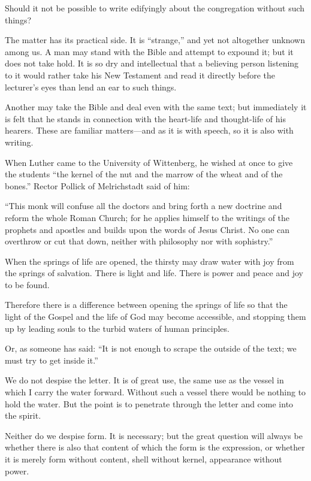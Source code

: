 Should it not be possible to write edifyingly about the congregation without such things?

The matter has its practical side. It is “strange,” and yet not altogether unknown among us. A man may stand with the Bible and attempt to expound it; but it does not take hold. It is so dry and intellectual that a believing person listening to it would rather take his New Testament and read it directly before the lecturer’s eyes than lend an ear to such things.

Another may take the Bible and deal even with the same text; but immediately it is felt that he stands in connection with the heart-life and thought-life of his hearers. These are familiar matters—and as it is with speech, so it is also with writing.

When Luther came to the University of Wittenberg, he wished at once to give the students “the kernel of the nut and the marrow of the wheat and of the bones.” Rector Pollick of Melrichstadt said of him:

“This monk will confuse all the doctors and bring forth a new doctrine and reform the whole Roman Church; for he applies himself to the writings of the prophets and apostles and builds upon the words of Jesus Christ. No one can overthrow or cut that down, neither with philosophy nor with sophistry.”

When the springs of life are opened, the thirsty may draw water with joy from the springs of salvation. There is light and life. There is power and peace and joy to be found.

Therefore there is a difference between opening the springs of life so that the light of the Gospel and the life of God may become accessible, and stopping them up by leading souls to the turbid waters of human principles.

Or, as someone has said: “It is not enough to scrape the outside of the text; we must try to get inside it.”

We do not despise the letter. It is of great use, the same use as the vessel in which I carry the water forward. Without such a vessel there would be nothing to hold the water. But the point is to penetrate through the letter and come into the spirit.

Neither do we despise form. It is necessary; but the great question will always be whether there is also that content of which the form is the expression, or whether it is merely form without content, shell without kernel, appearance without power.

